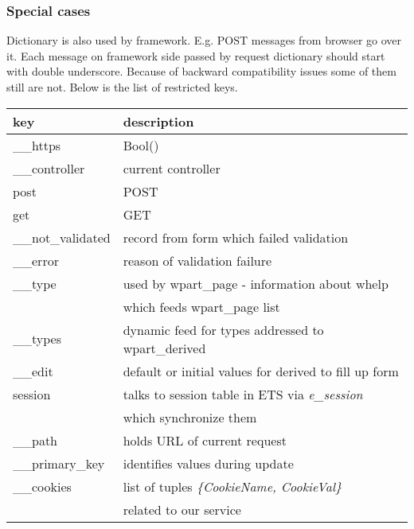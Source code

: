 \subsubsection{Special cases}
Dictionary is also used by framework. E.g. POST messages from browser go over
it. Each message on framework side passed by request dictionary should start with double
underscore.
Because of backward compatibility issues some of them still are not. Below is the list of
restricted keys. \newline \newline
\begin{tabular}{|l|l|}
  \hline
  {\bf key} & {\bf description}\\
  \hline
  \_\_https &  Bool() \\
  \_\_controller & current controller\\
  post & POST\\
  get & GET\\
  \_\_not\_validated & record from form which failed validation\\
  \_\_error & reason of validation failure\\
  \_\_type & used by wpart\_page - information about whelp \\ 
  & which  feeds wpart\_page list\\
  \_\_types & dynamic feed for types addressed to wpart\_derived\\
  \_\_edit & default or initial values for derived to  fill up form \\
  session & talks to session table in ETS via {\it e\_session} \\
  & which synchronize them \\
  \_\_path & holds URL of current request \\
  \_\_primary\_key & identifies values during update\\
  \_\_cookies & list of tuples {\it \{CookieName, CookieVal\}}\\
  & related to our service\\
  \hline
\end{tabular}


